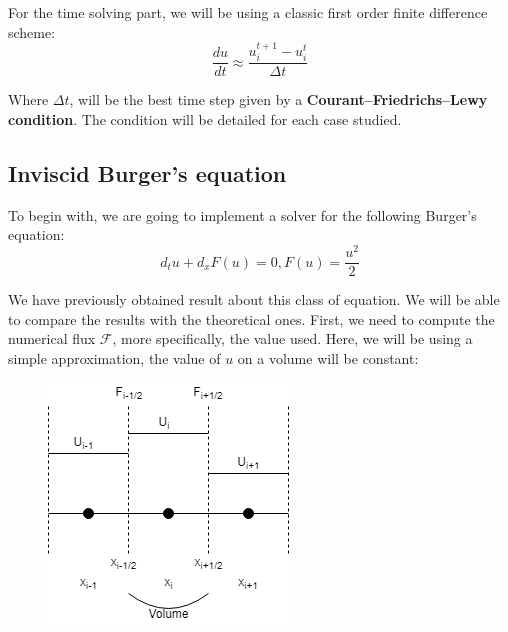         For the time solving part, we will be using a classic first order finite difference scheme:
        \begin{equation*}
            \frac{du}{dt}\approx \frac{u_i^{t+1}-u_i^t}{\Delta t}
        \end{equation*}
        
            Where $\Delta t$,  will be the best time step given by a  {\bf Courant–Friedrichs–Lewy condition}. The condition will be detailed for each case studied.
            
            
            
            
    
            
        
        
        
        
    
    \newpage
    \subsection{Inviscid Burger's equation}
    
        To begin with, we are going to implement a solver for the following Burger's equation:
        \begin{equation}
            d_t u+d_x F(u)=0, F(u)=\frac{u^2}{2}
        \end{equation}
        
        We have previously obtained result about this class of equation. We will be able to compare the results with the theoretical ones.
        First, we need to compute the numerical flux $\mathcal{F}$, more specifically, the value used. Here, we will be using a simple approximation, the value of $u$ on a volume will be constant:
        
        \begin{figure}[h]
            \centering
            \includegraphics{FluxBurger.png}
        \end{figure}
        
